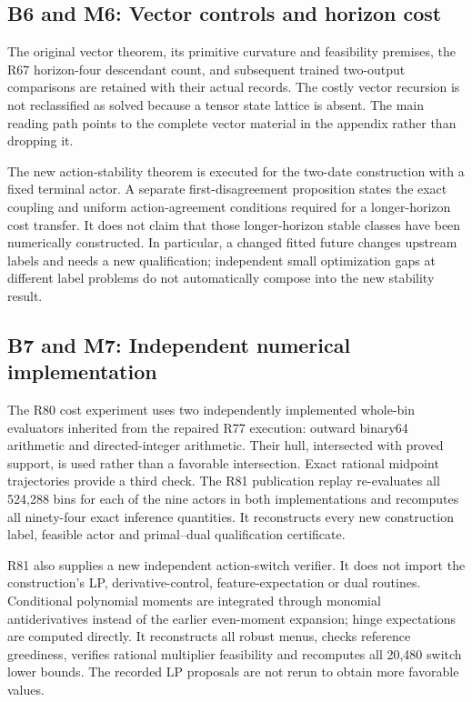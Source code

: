 \hypertarget{b6-and-m6-vector-controls-and-horizon-cost}{%
\subsection{B6 and M6: Vector controls and horizon
cost}\label{b6-and-m6-vector-controls-and-horizon-cost}}

The original vector theorem, its primitive curvature and feasibility
premises, the R67 horizon-four descendant count, and subsequent trained
two-output comparisons are retained with their actual records. The
costly vector recursion is not reclassified as solved because a tensor
state lattice is absent. The main reading path points to the complete
vector material in the appendix rather than dropping it.

The new action-stability theorem is executed for the two-date
construction with a fixed terminal actor. A separate first-disagreement
proposition states the exact coupling and uniform action-agreement
conditions required for a longer-horizon cost transfer. It does not
claim that those longer-horizon stable classes have been numerically
constructed. In particular, a changed fitted future changes upstream
labels and needs a new qualification; independent small optimization
gaps at different label problems do not automatically compose into the
new stability result.

\hypertarget{b7-and-m7-independent-numerical-implementation}{%
\subsection{B7 and M7: Independent numerical
implementation}\label{b7-and-m7-independent-numerical-implementation}}

The R80 cost experiment uses two independently implemented whole-bin
evaluators inherited from the repaired R77 execution: outward binary64
arithmetic and directed-integer arithmetic. Their hull, intersected with
proved support, is used rather than a favorable intersection. Exact
rational midpoint trajectories provide a third check. The R81
publication replay re-evaluates all 524,288 bins for each of the nine
actors in both implementations and recomputes all ninety-four exact
inference quantities. It reconstructs every new construction label,
feasible actor and primal--dual qualification certificate.

R81 also supplies a new independent action-switch verifier. It does not
import the construction's LP, derivative-control, feature-expectation or
dual routines. Conditional polynomial moments are integrated through
monomial antiderivatives instead of the earlier even-moment expansion;
hinge expectations are computed directly. It reconstructs all robust
menus, checks reference greediness, verifies rational multiplier
feasibility and recomputes all 20,480 switch lower bounds. The recorded
LP proposals are not rerun to obtain more favorable values.

